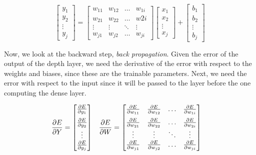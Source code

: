 \documentclass{article}
\begin{document}
\begin{equation}
	\begin{bmatrix} 
		y_1 \\ y_2 \\ \vdots \\ y_j
	\end{bmatrix} =
	\begin{bmatrix}
		w_{11} & w_{12} & \dots & w_{1i} \\
		w_{21} & w_{22} & \dots & w{2i} \\
		\vdots & \vdots & \ddots &\vdots \\
		w_{j1} & w_{j2} & \dots & w_{ji}
	\end{bmatrix}
	\begin{bmatrix} 
		x_1 \\ x_2 \\ \vdots \\ x_j
	\end{bmatrix} + 
	\begin{bmatrix} 
		b_1 \\ b_2 \\ \vdots \\ b_j
	\end{bmatrix} 
	\label{eq:outputsummatrix}
\end{equation}

\noindent Now, we look at the backward step, \textit{back propagation}. Given the error of the output of the depth layer, 
we need the derivative of the error with respect to the weights and biases, since these are the trainable parameters. Next, 
we need the error with respect to the input since it will be passed to the layer before the one computing the dense layer.

\begin{align}
	\displaystyle\frac{\partial E}{\partial Y}&=\begin{bmatrix}
		\frac{\partial E}{\partial y_1} 
		\vspace{0.2cm} \\
		\frac{\partial E}{\partial y_2} \\
		\vdots \\
		\frac{\partial E}{\partial y_j}
	\end{bmatrix} &
		\displaystyle\frac{\partial E}{\partial W}&=\begin{bmatrix}
			\frac{\partial E}{\partial w_{11}} &
			\frac{\partial E}{\partial w_{12}} &
			\dots &
			\frac{\partial E}{\partial w_{1i}}
			\vspace{0.2cm} \\
			\frac{\partial E}{\partial w_{21}} &
			\frac{\partial E}{\partial w_{22}} &
			\dots &
			\frac{\partial E}{\partial w_{2i}} \\
			\vdots & \vdots & \ddots & \vdots \\
			\frac{\partial E}{\partial w_{j1}} &
			\frac{\partial E}{\partial w_{j2}} &
			\dots &
			\frac{\partial E}{\partial w_{ji}} \\
		\end{bmatrix}
	\label{eq:errors}
\end{align}
\end{document}
